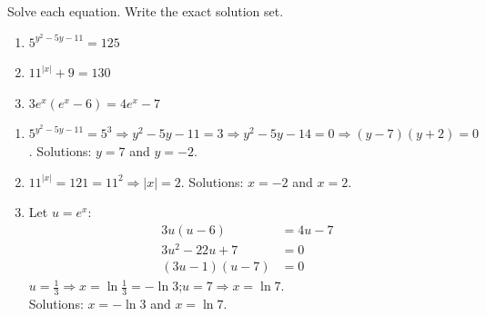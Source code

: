 \documentclass{ximera}
\begin{document}
\begin{problem}
Solve each equation. Write the exact solution set.
\begin{enumerate}
  \item[(a)] $5^{y^2-5y-11} = 125$ 
  \medskip
  \item[(b)] $11^{|x|}+9 = 130$ 
  \medskip
  \item[(c)] $3e^x(e^x-6) = 4e^x - 7$ 
\end{enumerate}

\begin{solution}
\begin{enumerate}
  \item[(a)] $5^{y^2-5y-11} = 5^3 \Rightarrow y^2-5y-11=3 \Rightarrow y^2-5y-14=0 \Rightarrow (y-7)(y+2)=0$.
  Solutions: $\boxed{y=7}$ and $\boxed{y=-2}$.

  \item[(b)] $11^{|x|} = 121 = 11^2 \Rightarrow |x|=2$.
  Solutions: $\boxed{x=-2}$ and $\boxed{x=2}$.

  \item[(c)] Let $u = e^x$:
  \begin{align*}
    3u(u-6) &= 4u-7\\
    3u^2-22u+7 &= 0\\
    (3u-1)(u-7) &= 0
  \end{align*}
  $u=\tfrac{1}{3} \Rightarrow x = \ln\tfrac{1}{3} = -\ln 3$;\quad $u=7 \Rightarrow x = \ln 7$.\\
  Solutions: $\boxed{x = -\ln 3}$ and $\boxed{x = \ln 7}$.
\end{enumerate}
\end{solution}
\end{problem}
\end{document}
